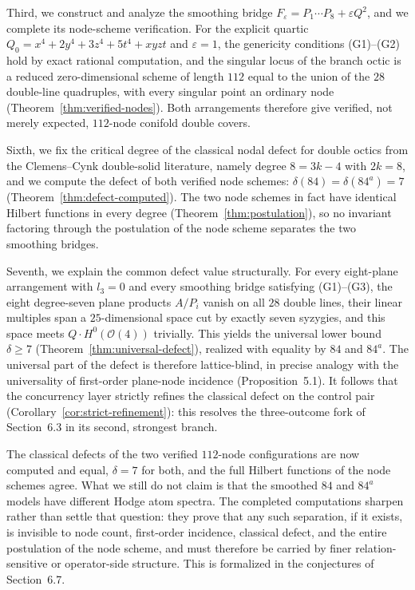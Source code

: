 Third, we construct and analyze the smoothing bridge
$F_\varepsilon = P_1 \cdots P_8 + \varepsilon Q^2$, and we complete its
node-scheme verification. For the explicit quartic
$Q_0 = x^4 + 2y^4 + 3z^4 + 5t^4 + xyzt$ and $\varepsilon = 1$, the
genericity conditions (G1)--(G2) hold by exact rational computation, and the
singular locus of the branch octic is a reduced zero-dimensional scheme of
length $112$ equal to the union of the $28$ double-line quadruples, with
every singular point an ordinary node (Theorem~\ref{thm:verified-nodes}).
Both arrangements therefore give verified, not merely expected, $112$-node
conifold double covers.

Sixth, we fix the critical degree of the classical nodal defect for double
octics from the Clemens--Cynk double-solid literature, namely degree
$8 = 3k - 4$ with $2k = 8$, and we compute the defect of both verified
node schemes: $\delta(84) = \delta(84^{a}) = 7$
(Theorem~\ref{thm:defect-computed}). The two node schemes in fact have
identical Hilbert functions in every degree
(Theorem~\ref{thm:postulation}), so no invariant factoring through the
postulation of the node scheme separates the two smoothing bridges.

Seventh, we explain the common defect value structurally. For every
eight-plane arrangement with $l_3 = 0$ and every smoothing bridge satisfying
(G1)--(G3), the eight degree-seven plane products $A/P_i$ vanish on all
$28$ double lines, their linear multiples span a $25$-dimensional space cut
by exactly seven syzygies, and this space meets $Q \cdot H^0(\mathcal{O}(4))$
trivially. This yields the universal lower bound $\delta \geq 7$
(Theorem~\ref{thm:universal-defect}), realized with equality by $84$ and
$84^{a}$. The universal part of the defect is therefore lattice-blind, in
precise analogy with the universality of first-order plane-node incidence
(Proposition~5.1). It follows that the concurrency layer strictly refines
the classical defect on the control pair
(Corollary~\ref{cor:strict-refinement}): this resolves the three-outcome
fork of Section~6.3 in its second, strongest branch.


The classical defects of the two verified $112$-node configurations are now
computed and equal, $\delta = 7$ for both, and the full Hilbert functions of
the node schemes agree. What we still do not claim is that the smoothed
$84$ and $84^{a}$ models have different Hodge atom spectra. The completed
computations sharpen rather than settle that question: they prove that any
such separation, if it exists, is invisible to node count, first-order
incidence, classical defect, and the entire postulation of the node scheme,
and must therefore be carried by finer relation-sensitive or operator-side
structure. This is formalized in the conjectures of Section~6.7.

